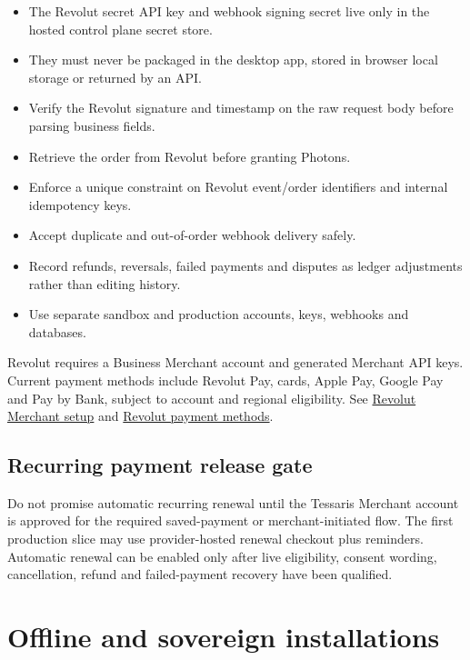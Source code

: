 \documentclass[11pt]{article}
\begin{document}
\begin{itemize}
  \item The Revolut secret API key and webhook signing secret live only in the hosted control plane secret store.
  \item They must never be packaged in the desktop app, stored in browser local storage or returned by an API.
  \item Verify the Revolut signature and timestamp on the raw request body before parsing business fields.
  \item Retrieve the order from Revolut before granting Photons.
  \item Enforce a unique constraint on Revolut event/order identifiers and internal idempotency keys.
  \item Accept duplicate and out-of-order webhook delivery safely.
  \item Record refunds, reversals, failed payments and disputes as ledger adjustments rather than editing history.
  \item Use separate sandbox and production accounts, keys, webhooks and databases.
\end{itemize}

Revolut requires a Business Merchant account and generated Merchant API keys. Current payment methods include Revolut Pay, cards, Apple Pay, Google Pay and Pay by Bank, subject to account and regional eligibility. See \href{https://developer.revolut.com/docs/guides/merchant/get-started}{Revolut Merchant setup} and \href{https://developer.revolut.com/docs/sdks/merchant-web-sdk/payment-methods/introduction}{Revolut payment methods}.

\subsection{Recurring payment release gate}

Do not promise automatic recurring renewal until the Tessaris Merchant account is approved for the required saved-payment or merchant-initiated flow. The first production slice may use provider-hosted renewal checkout plus reminders. Automatic renewal can be enabled only after live eligibility, consent wording, cancellation, refund and failed-payment recovery have been qualified.

\section{Offline and sovereign installations}
\end{document}
